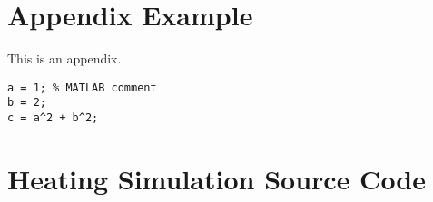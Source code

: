 \chapter{Appendix Example}\label{app:appendix_example}

This is an appendix.

\begin{lstlisting}
a = 1; % MATLAB comment
b = 2;
c = a^2 + b^2;
\end{lstlisting}


\chapter{Heating Simulation Source Code}\label{app:iceSimCode}
